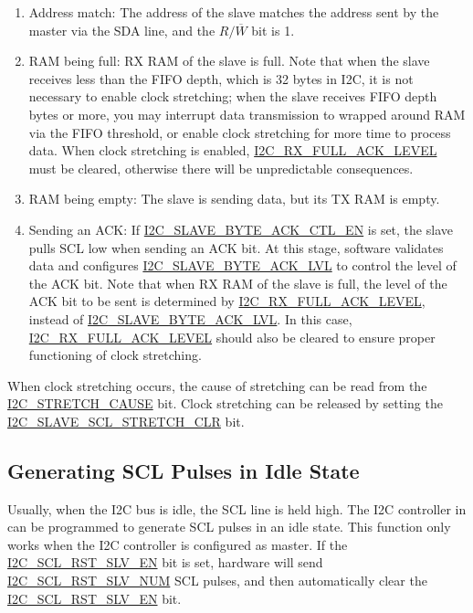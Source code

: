 \documentclass[main\_\_EN.tex]{subfiles}
\begin{document}
\begin{enumerate}
\item Address match: The address of the slave matches the address sent by the master via the SDA line, and the $R/\overline W$ bit is 1.
\item RAM being full: RX RAM of the slave is full. Note that when the slave receives less than the FIFO depth, which is 32 bytes in \chipname{} I2C, it is not necessary to enable clock stretching; when the slave receives FIFO depth bytes or more, you may interrupt data transmission to wrapped around RAM via the FIFO threshold, or enable clock stretching for more time to process data. When clock stretching is enabled, \hyperref[fielddesc:I2CRXFULLACKLEVEL]{I2C\_RX\_FULL\_ACK\_LEVEL} must be cleared, otherwise there will be unpredictable consequences.
\item RAM being empty: The slave is sending data, but its TX RAM is empty.
\item Sending an ACK: If \hyperref[fielddesc:I2CSLAVEBYTEACKCTLEN]{I2C\_SLAVE\_BYTE\_ACK\_CTL\_EN} is set, the slave pulls SCL low when sending an ACK bit. At this stage, software validates data and configures \hyperref[fielddesc:I2CSLAVEBYTEACKLVL]{I2C\_SLAVE\_BYTE\_ACK\_LVL} to control the level of the ACK bit. Note that when RX RAM of the slave is full, the level of the ACK bit to be sent is determined by \hyperref[fielddesc:I2CRXFULLACKLEVEL]{I2C\_RX\_FULL\_ACK\_LEVEL}, instead of \hyperref[fielddesc:I2CSLAVEBYTEACKLVL]{I2C\_SLAVE\_BYTE\_ACK\_LVL}. In this case, \hyperref[fielddesc:I2CRXFULLACKLEVEL]{I2C\_RX\_FULL\_ACK\_LEVEL} should also be cleared to ensure proper functioning of clock stretching.
\end{enumerate}

When clock stretching occurs, the cause of stretching can be read from the \hyperref[fielddesc:I2CSTRETCHCAUSE]{I2C\_STRETCH\_CAUSE} bit. Clock stretching can be released by setting the \hyperref[fielddesc:I2CSLAVESCLSTRETCHCLR]{I2C\_SLAVE\_SCL\_STRETCH\_CLR} bit.

\subsection{Generating SCL Pulses in Idle State}

Usually, when the I2C bus is idle, the SCL line is held high. The I2C controller in \chipname{} can be programmed to generate SCL pulses in an idle state. This function only works when the I2C controller is configured as master. If the \hyperref[fielddesc:I2CSCLRSTSLVEN]{I2C\_SCL\_RST\_SLV\_EN} bit is set, hardware will send \hyperref[fielddesc:I2CSCLRSTSLVNUM]{I2C\_SCL\_RST\_SLV\_NUM} SCL pulses, and then automatically clear the \hyperref[fielddesc:I2CSCLRSTSLVEN]{I2C\_SCL\_RST\_SLV\_EN} bit.
\end{document}
